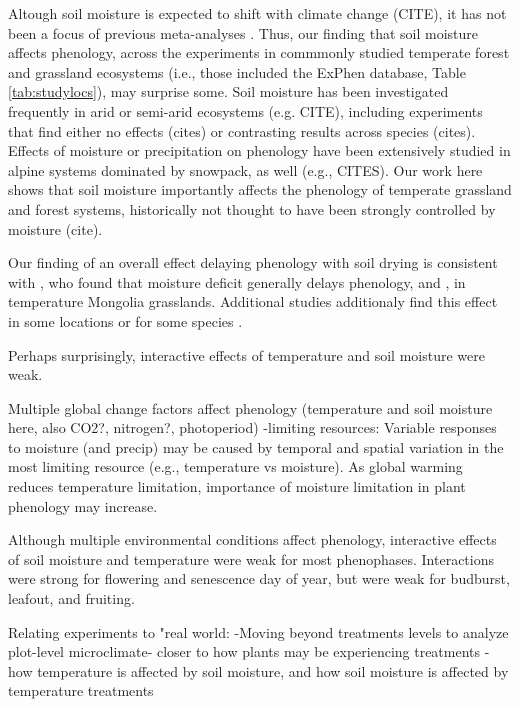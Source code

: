\documentclass{article}
\begin{document}
\par Altough soil moisture is expected to shift with climate change (CITE), it has not been a focus of previous meta-analyses  \cite{wolkovich2012}. Thus, our finding that soil moisture affects phenology, across the experiments in commmonly studied temperate forest and grassland ecosystems (i.e., those included the ExPhen database, Table \ref{tab:studylocs}), may surprise some. Soil moisture has been investigated frequently in arid or semi-arid ecosystems (e.g. CITE), including experiments that find either no effects (cites) or contrasting results across species (cites). Effects of moisture or precipitation on phenology have been extensively studied in alpine systems dominated by snowpack, as well (e.g., CITES). Our work here shows that soil moisture importantly affects the phenology of temperate grassland and forest systems, historically not thought to have been strongly controlled by moisture (cite). 

\par Our finding of an overall effect delaying phenology with soil drying is consistent with \citet{seyed2018}, who found that moisture deficit generally delays phenology, and  \citet{tao2020}, in temperature Mongolia grasslands. Additional studies additionaly find this effect in some locations \citep{wang2022} or for some species \citep{tao2019}. 

\par Perhaps surprisingly, interactive effects of temperature and soil moisture were weak.

\par Multiple global change factors affect phenology (temperature and soil moisture here, also CO2?, nitrogen?, photoperiod)
 -limiting resources: Variable responses to moisture (and precip) may be caused by temporal and spatial variation in the most limiting resource (e.g., temperature vs moisture). As global warming reduces temperature limitation, importance of moisture limitation in plant phenology may increase. 

\par Although multiple environmental conditions affect phenology,  interactive effects of soil moisture and temperature were weak for most phenophases. Interactions were strong for flowering and senescence day of year, but were weak for budburst, leafout, and fruiting. 


\par Relating experiments to "real world:
    -Moving beyond treatments levels to analyze plot-level microclimate- closer to how plants may be experiencing treatments
    -how temperature is affected by soil moisture, and how soil moisture is affected by temperature treatments
\end{document}
